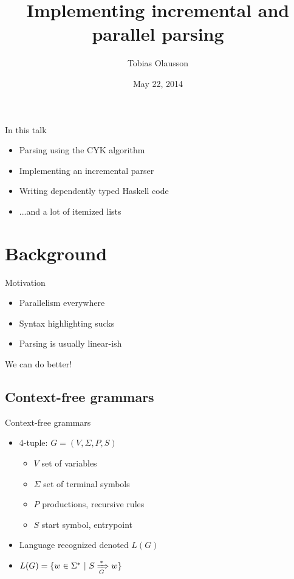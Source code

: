 \documentclass{beamer}
\title{Implementing incremental and parallel parsing}
\author{Tobias Olausson}
\institute{University of Gothenburg}
\date{May 22, 2014}
\begin{document}
\begin{frame}
\titlepage
\end{frame}

\begin{frame}{In this talk}
    \begin{itemize}
        \item Parsing using the CYK algorithm
        \item Implementing an incremental parser
        \item Writing dependently typed Haskell code
        \item ...and a lot of itemized lists
    \end{itemize}
\end{frame}

\section{Background}
\begin{frame}{Motivation}
    \begin{itemize}
        \item Parallelism everywhere
        \item Syntax highlighting sucks
        \item Parsing is usually linear-ish
    \end{itemize}
    We can do better!
\end{frame}

\subsection{Context-free grammars}
\begin{frame}{Context-free grammars}
    \begin{itemize}
        \item 4-tuple: $G = (V, \Sigma, P, S)$
        \begin{itemize}
            \item $V$ set of variables
            \item $\Sigma$ set of terminal symbols
            \item $P$ productions, recursive rules
            \item $S$ start symbol, entrypoint
        \end{itemize}
        \item Language recognized denoted $L(G)$
        \item $L(G) = \{w \in \Sigma^* \ |\  S \xRightarrow[G]{*} w\}$
    \end{itemize}
\end{frame}
\end{document}
